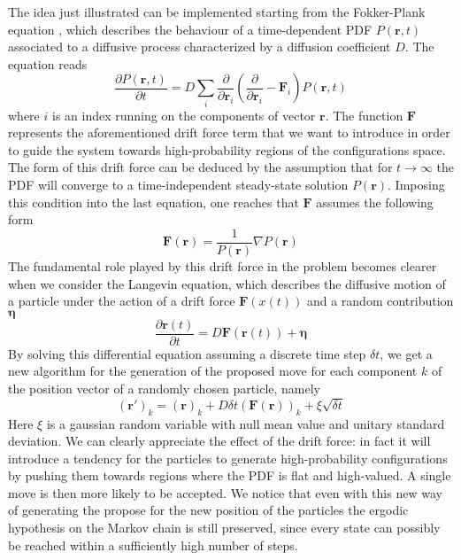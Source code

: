 The idea just illustrated can be implemented starting from the Fokker-Plank equation \cite{lectures2015}, which describes the behaviour of a time-dependent PDF $P(\bm{r}, t)$ associated to a diffusive process characterized by a diffusion coefficient $D$. The equation reads
\begin{equation*}
    \frac{\partial P(\bm{r}, t)}{\partial t} = D \sum_i \frac{\partial}{\partial \bm{r}_i} \left( \frac{\partial}{\partial \bm{r}_i} - \bm{F}_i \right) P(\bm{r}, t)
\end{equation*}
where $i$ is an index running on the components of vector $\bm{r}$. The function $\bm{F}$ represents the aforementioned drift force term that we want to introduce in order to guide the system towards high-probability regions of the configurations space. The form of this drift force can be deduced by the assumption that for $t\rightarrow \infty$ the PDF will converge to a time-independent steady-state solution $P(\bm{r})$. Imposing this condition into the last equation, one reaches that $\bm{F}$ assumes the following form
\begin{equation*}
    \bm{F}(\bm{r}) = \frac{1}{P(\bm{r})} \nabla P(\bm{r})
\end{equation*}
The fundamental role played by this drift force in the problem becomes clearer when we consider the Langevin equation, which describes the diffusive motion of a particle under the action of a drift force $\bm{F}(x(t))$ and a random contribution $\bm{\eta}$ 
\begin{equation*}
    \frac{\partial \bm{r}(t)}{\partial t} = D \bm{F}(\bm{r}(t)) + \bm{\eta}  
\end{equation*}
By solving this differential equation assuming a discrete time step $\delta t$, we get a new algorithm for the generation of the proposed move for each component $k$ of the position vector of a randomly chosen particle, namely
\begin{equation}
    (\bm{r}')_k = (\bm{r})_k + D\delta t  (\bm{F}(\bm{r}))_k+ \xi \sqrt{\delta t}
    \label{new_position_importance}
\end{equation}
Here $\xi$ is a gaussian random variable with null mean value and unitary standard deviation. We can clearly appreciate the effect of the drift force: in fact it will introduce a tendency for the particles to generate high-probability configurations by pushing them towards regions where the PDF is flat and high-valued. A single move is then more likely to be accepted. We notice that even with this new way of generating the propose for the new position of the particles the ergodic hypothesis on the Markov chain is still preserved, since every state can possibly be reached within a sufficiently high number of steps. 

